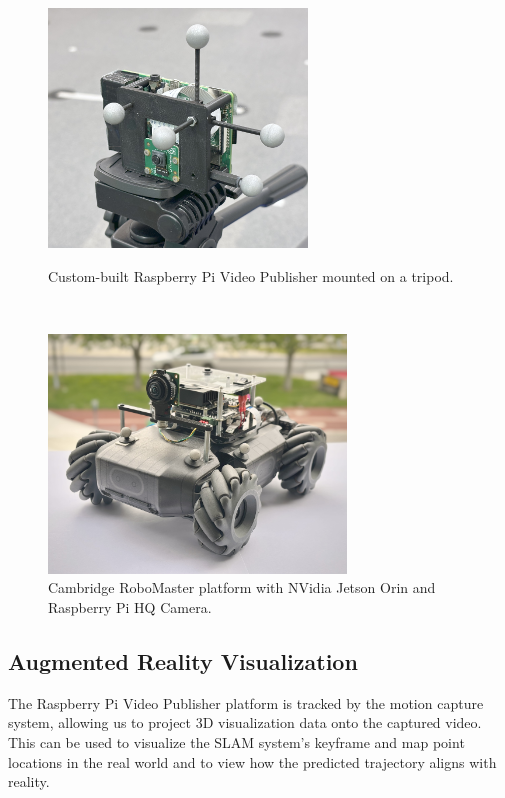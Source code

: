 \begin{figure}[h]
    \centering
    \captionsetup{format=plain}
    \begin{minipage}[t]{0.475\linewidth}
        \centering
        \includegraphics[height=2.5in]{figures/rpi_cam.jpg}

        \caption{Custom-built Raspberry Pi Video Publisher mounted on a tripod.}
        \label{fig:rpi-cam}
    \end{minipage}\hfill%
    ~
    \begin{minipage}[t]{0.475\linewidth}
        \centering
        \includegraphics[height=2.5in]{figures/robomaster.jpg}
        \caption{Cambridge RoboMaster platform with NVidia Jetson Orin and Raspberry Pi HQ Camera.}
        \label{fig:tum-traj}
    \end{minipage}
\end{figure}


\subsection{Augmented Reality Visualization}
\label{sec:augmented-reality-visualization}
The Raspberry Pi Video Publisher platform is tracked by the motion capture system, allowing us to project 3D visualization data onto the captured video. This can be used to visualize the SLAM system's keyframe and map point locations in the real world and to view how the predicted trajectory aligns with reality.

